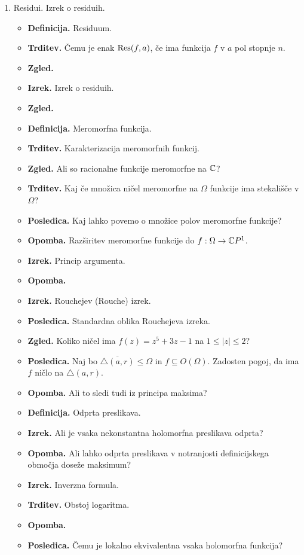 \begin{enumerate}
    \item Residui. Izrek o residuih.
    \begin{itemize}
        \item \textbf{Definicija.} Residuum.
        \item \textbf{Trditev.} Čemu je enak \(\operatorname{Res}(f, a)\), če ima funkcija \(f\) v \(a\) pol stopnje \(n\).
        \item \textbf{Zgled.} 
        \item \textbf{Izrek.} Izrek o residuih.
        \item \textbf{Zgled.} 
        \item \textbf{Definicija.} Meromorfna funkcija. 
        \item \textbf{Trditev.} Karakterizacija meromorfnih funkcij.
        \item \textbf{Zgled.} Ali so racionalne funkcije meromorfne na \(\mathbb{C}\)?
        \item \textbf{Trditev.} Kaj če množica ničel meromorfne na \(\Omega\) funkcije ima stekališče v \(\Omega\)?
        \item \textbf{Posledica.} Kaj lahko povemo o množice polov meromorfne funkcije?
        \item \textbf{Opomba.} Razširitev meromorfne funkcije do \(f: \Omega \to \mathbb{C} P^1\).
        \item \textbf{Izrek.} Princip argumenta.
        \item \textbf{Opomba.} \todo{}
        \item \textbf{Izrek.} Rouchejev (Rouche) izrek.
        \item \textbf{Posledica.} Standardna oblika Rouchejeva izreka.
        \item \textbf{Zgled.} Koliko ničel ima \(f(z) = z^5 + 3z - 1\) na \(1 \leq |z| \leq 2\)?
        \item \textbf{Posledica.} Naj bo \(\overline{\triangle(a, r)} \leq \Omega\) in \(f \subseteq O(\Omega)\). Zadosten pogoj, da ima \(f\) ničlo na \(\triangle(a, r)\).
        \item \textbf{Opomba.} Ali to sledi tudi iz principa maksima?
        \item \textbf{Definicija.} Odprta preslikava.
        \item \textbf{Izrek.} Ali je vsaka nekonstantna holomorfna preslikava odprta?
        \item \textbf{Opomba.} Ali lahko odprta preslikava v notranjosti definicijskega območja doseže maksimum?
        \item \textbf{Izrek.} Inverzna formula.
        \item \textbf{Trditev.} Obstoj logaritma.
        \item \textbf{Opomba.} \todo{}
        \item \textbf{Posledica.} Čemu je lokalno ekvivalentna vsaka holomorfna funkcija? 
    \end{itemize}
\end{enumerate}

